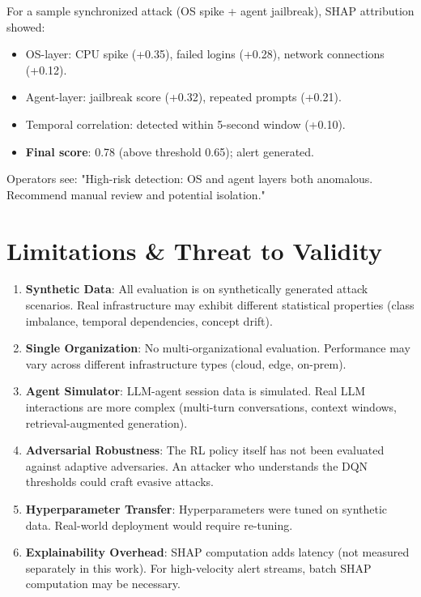 \documentclass[conference]{IEEEtran}
\begin{document}
For a sample synchronized attack (OS spike + agent jailbreak), SHAP attribution showed:
\begin{itemize}
\item OS-layer: CPU spike (+0.35), failed logins (+0.28), network connections (+0.12).
\item Agent-layer: jailbreak score (+0.32), repeated prompts (+0.21).
\item Temporal correlation: detected within 5-second window (+0.10).
\item \textbf{Final score}: 0.78 (above threshold 0.65); alert generated.
\end{itemize}

Operators see: "High-risk detection: OS and agent layers both anomalous. Recommend manual review and potential isolation."

\section{Limitations \& Threat to Validity}\label{sec:limitations}

\begin{enumerate}
\item \textbf{Synthetic Data}: All evaluation is on synthetically generated attack scenarios. Real infrastructure may exhibit different statistical properties (class imbalance, temporal dependencies, concept drift).
\item \textbf{Single Organization}: No multi-organizational evaluation. Performance may vary across different infrastructure types (cloud, edge, on-prem).
\item \textbf{Agent Simulator}: LLM-agent session data is simulated. Real LLM interactions are more complex (multi-turn conversations, context windows, retrieval-augmented generation).
\item \textbf{Adversarial Robustness}: The RL policy itself has not been evaluated against adaptive adversaries. An attacker who understands the DQN thresholds could craft evasive attacks.
\item \textbf{Hyperparameter Transfer}: Hyperparameters were tuned on synthetic data. Real-world deployment would require re-tuning.
\item \textbf{Explainability Overhead}: SHAP computation adds latency (not measured separately in this work). For high-velocity alert streams, batch SHAP computation may be necessary.
\end{enumerate}
\end{document}
